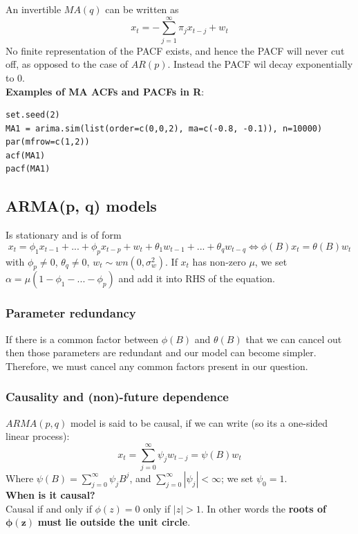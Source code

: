 \documentclass[11pt]{article}
\newcommand{\noi}{\noindent}
\begin{document}
\noi An invertible $MA(q)$ can be written as
$$x_t = -\sum_{j=1}^{\infty}{\pi_jx_{t-j} + w_t}$$
\noi No finite representation of the PACF exists, and hence the PACF will never cut off, as opposed to the case of $AR(p)$. Instead the PACF wil decay exponentially to $0$. \\

\noi \textbf{Examples of MA ACFs and PACFs in R}:
\begin{lstlisting}
set.seed(2)
MA1 = arima.sim(list(order=c(0,0,2), ma=c(-0.8, -0.1)), n=10000)
par(mfrow=c(1,2))
acf(MA1)
pacf(MA1)
\end{lstlisting}

\subsection{ARMA(p, q) models}
\noi Is stationary and is of form
$$x_t = \phi_1 x_{t-1} + ... + \phi_p x_{t-p} + w_t + \theta_1 w_{t-1} + ... + \theta_q w_{t-q} \Leftrightarrow \phi(B)x_t = \theta(B)w_t$$
\noi with $\phi_p \neq 0$, $\theta_q \neq 0$, $w_t \sim wn(0, \sigma_w^2)$. If $x_t$ has non-zero $\mu$, we set $\alpha = \mu(1 - \phi_1 - ... - \phi_p)$ and add it into RHS of the equation.

\subsubsection{Parameter redundancy}
\noi If there is a common factor between $\phi(B)$ and $\theta(B)$ that we can cancel out then those parameters are redundant and our model can become simpler. Therefore, we must cancel any common factors present in our question.

\subsubsection{Causality and (non)-future dependence}
\noi $ARMA(p,q)$ model is said to be causal, if we can write (so its a one-sided linear process):
$$x_t = \sum_{j=0}^{\infty}{\psi_jw_{t-j} = \psi(B)w_t}$$
\noi Where $\psi(B) = \sum_{j=0}^{\infty}{\psi_j B^j}$, and $\sum_{j=0}^{\infty}|\psi_j| < \infty$; we set $\psi_0 = 1$. \\

\noi \textbf{When is it causal?} \\
\noi Causal if and only if $\phi(z) = 0$ only if $|z|>1$. In other words the \textbf{roots of} $\boldsymbol{\phi(z)}$ \textbf{must lie outside the unit circle}. \\
\end{document}
